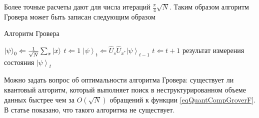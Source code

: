 Более точные расчеты \cite{nielsen2000quantum} дают для числа итераций
$\frac{\pi}{4}\sqrt{N}$. Таким образом алгоритм Гровера может быть
записан следующим образом  
\begin{algorithm}
\caption{Алгоритм Гровера}
\label{algQuantCompGrover}
\begin{algorithmic}
    \STATE $\left|\psi\right>_0 \Leftarrow \frac{1}{\sqrt{N}}\sum_x 
    \ket{x}$
    \STATE $t \Leftarrow 1$
    \REPEAT
    \STATE $\left|\psi\right>_t \Leftarrow \hat{U}_s\hat{U}_{x^{\ast}}
    \left|\psi\right>_{t-1}$
    \STATE $t \Leftarrow t + 1$
    \RETURN результат измерения состояния $\left|\psi\right>_t$
\end{algorithmic}
\end{algorithm}

Можно задать вопрос об оптимальности алгоритма Гровера: существует ли
квантовый алгоритм, который выполняет поиск в неструктурированном
объеме данных быстрее чем за $O\left(\sqrt{N}\right)$ обращений к
функции \eqref{eqQuantCompGroverF}. В статье
\cite{bBennettGroverOptimal} показано, что такого алгоритма
не существует.
